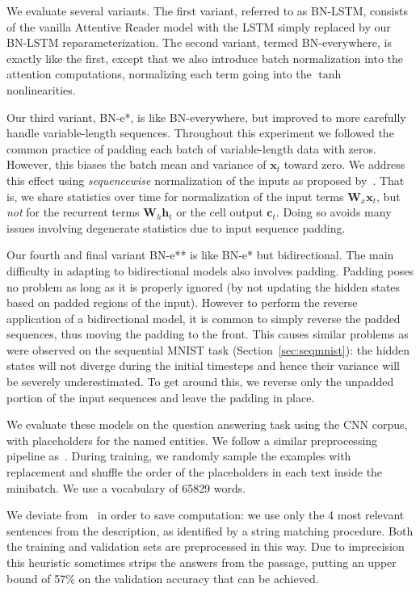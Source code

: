 \documentclass{article} %
\newcommand{\vect}[1]{\mathbf{#1}}
\newcommand{\mat}[1]{\mathbf{#1}}
\begin{document}
We evaluate several variants.  The first variant, referred to as BN-LSTM,
consists of the vanilla Attentive Reader model with the LSTM simply replaced by
our BN-LSTM reparameterization.  The second variant, termed BN-everywhere, is
exactly like the first, except that we also introduce batch normalization into
the attention computations, normalizing each term going into the $\tanh$
nonlinearities.

Our third variant, BN-e*, is like BN-everywhere, but improved to more carefully
handle variable-length sequences.  Throughout this experiment we followed the
common practice of padding each batch of variable-length data with zeros.
However, this biases the batch mean and variance of $\vect{x}_t$ toward zero.
We address this effect using \emph{sequencewise} normalization of the inputs as
proposed by~\citep{cesar,baidu}.  That is, we share statistics over time for
normalization of the input terms $\mat{W}_x \vect{x}_t$, but \emph{not} for the
recurrent terms $\mat{W}_h \vect{h}_t$ or the cell output $\vect{c}_t$.  Doing
so avoids many issues involving degenerate statistics due to input sequence
padding.

Our fourth and final variant BN-e** is like BN-e* but bidirectional.  The main
difficulty in adapting to bidirectional models also involves padding.  Padding
poses no problem as long as it is properly ignored (by not updating the hidden
states based on padded regions of the input).  However to perform the reverse
application of a bidirectional model, it is common to simply reverse the padded
sequences, thus moving the padding to the front.  This causes similar problems
as were observed on the sequential MNIST task (Section~\ref{sec:seqmnist}): the
hidden states will not diverge during the initial timesteps and hence their
variance will be severely underestimated.  To get around this, we reverse only
the unpadded portion of the input sequences and leave the padding in place.

We evaluate these models on the question answering task using the CNN corpus,
with placeholders for the named entities. We follow a similar preprocessing
pipeline as~\citet{attentivereader}.  During training, we randomly sample the
examples with replacement and shuffle the order of the placeholders in each
text inside the minibatch.  We use a vocabulary of 65829 words.

We deviate from~\citet{attentivereader} in order to save computation:
we use only the 4 most relevant sentences from the description,
as identified by a string matching procedure.
Both the training and validation sets are preprocessed in this way.
Due to imprecision this heuristic sometimes strips the answers from the passage,
putting an upper bound of 57\% on the validation accuracy that can be achieved.
\end{document}
